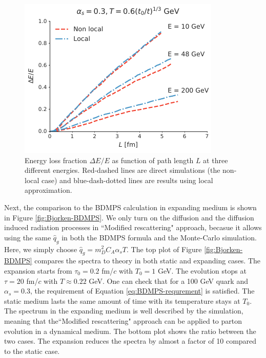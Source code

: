 \documentclass[aps, prc, reprint, amsmath, groupedaddress, nofootinbib]{revtex4-1}
\begin{document}
{\begin{figure}
\includegraphics[width=\columnwidth]{Bjorken.pdf}
\caption{Energy loss fraction $\Delta E /E$ as function of path length $L$ at three different energies. Red-dashed lines are direct simulations (the non-local case) and blue-dash-dotted lines are results using local approximation.}
\label{fig:Bjorken}
\end{figure}


Next, the comparison to the BDMPS calculation in expanding medium is shown in Figure \ref{fig:Bjorken-BDMPS}.
We only turn on the diffusion and the diffusion induced radiation  processes in ``Modified rescattering" approach, becasue it allows using the same $\hat{q}_g$ in both the BDMPS formula and the Monte-Carlo simulation.
Here, we simply choose $\hat{q}_g = m_D^2 C_A\alpha_s T$.
The top plot of Figure \ref{fig:Bjorken-BDMPS} compares the spectra to theory in both static and expanding cases. 
The expansion starts from $\tau_0=0.2$ fm/$c$ with $T_0=1$ GeV. 
The evolution stops at $\tau = 20$ fm/$c$ with $T \approx 0.22$ GeV.
One can check that for a 100 GeV quark and $\alpha_s = 0.3$, the requirement of Equation \ref{eq:BDMPS-requrement} is satisfied.
The static medium lasts the same amount of time with its temperature stays at $T_0$.
The spectrum in the expanding medium is well described by the simulation, meaning that the``Modified rescattering" approach can be applied to parton evolution in a dynamical medium.
The bottom plot shows the ratio between the two cases. 
The expansion reduces the spectra by almost a factor of 10 compared to the static case.

}
\end{document}

